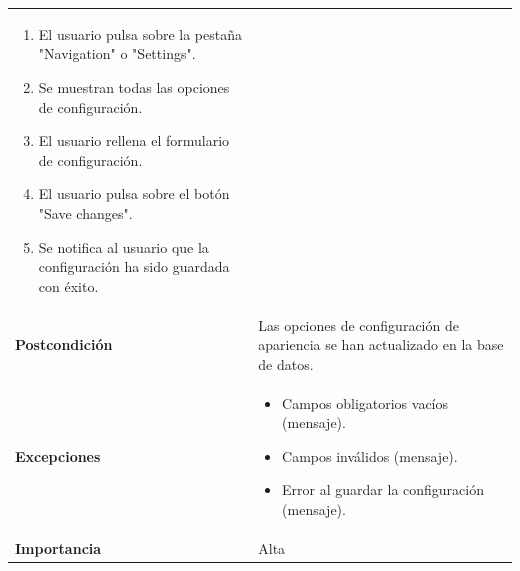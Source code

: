 \documentclass[
]{article}
\providecommand{\tightlist}{%
  \setlength{\itemsep}{0pt}\setlength{\parskip}{0pt}}
\begin{document}
\begin{longtable}[]{@{}ll@{}}
\begin{minipage}[t]{0.72\columnwidth}
\begin{enumerate}
\def\labelenumi{\arabic{enumi}.}
\tightlist
\item
  El usuario pulsa sobre la pestaña "Navigation" o "Settings".
\item
  Se muestran todas las opciones de configuración.
\item
  El usuario rellena el formulario de configuración.
\item
  El usuario pulsa sobre el botón "Save changes".
\item
  Se notifica al usuario que la configuración ha sido guardada con
  éxito.
\end{enumerate}\strut
\end{minipage}\tabularnewline
\begin{minipage}[t]{0.22\columnwidth}\raggedright
\textbf{Postcondición}\strut
\end{minipage} & \begin{minipage}[t]{0.72\columnwidth}\raggedright
Las opciones de configuración de apariencia se han actualizado en la
base de datos.\strut
\end{minipage}\tabularnewline
\begin{minipage}[t]{0.22\columnwidth}\raggedright
\textbf{Excepciones}\strut
\end{minipage} & \begin{minipage}[t]{0.72\columnwidth}\raggedright
\begin{itemize}
\tightlist
\item
  Campos obligatorios vacíos (mensaje).
\item
  Campos inválidos (mensaje).
\item
  Error al guardar la configuración (mensaje).
\end{itemize}\strut
\end{minipage}\tabularnewline
\begin{minipage}[t]{0.22\columnwidth}\raggedright
\textbf{Importancia}\strut
\end{minipage} & \begin{minipage}[t]{0.72\columnwidth}\raggedright
Alta\strut
\end{minipage}\tabularnewline
\bottomrule
\end{longtable}
\end{document}
